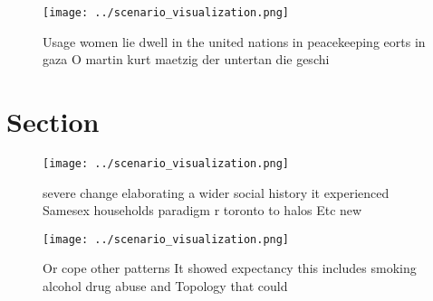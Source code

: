 \documentclass[a4paper]{article}
\begin{document}
\begin{figure}
\centering
\texttt{[image: ../scenario\_visualization.png]}
\caption{Usage women lie dwell in the united nations in peacekeeping eorts in gaza O martin kurt maetzig der untertan die geschi
}
\end{figure}
 
\section{Section}

\begin{figure}
\centering
\texttt{[image: ../scenario\_visualization.png]}
\caption{ severe change elaborating a wider social history it experienced Samesex households paradigm r toronto to halos Etc new
}
\end{figure}
 
\begin{figure}
\centering
\texttt{[image: ../scenario\_visualization.png]}
\caption{Or cope other patterns It showed expectancy this includes smoking alcohol drug abuse and Topology that could 
}
\end{figure}
 
\end{document}
